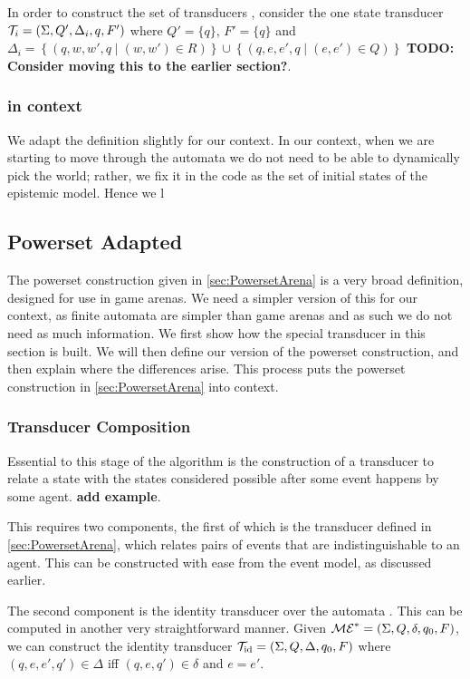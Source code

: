 \documentclass[12pt, a4paper]{article}
\begin{document}
In order to construct the set of transducers , consider the one state
transducer $\mathcal{T}_i = (\Sigma, Q', \Delta_i, q, F')$ where $Q' = \{q\}$, $F' =
\{q\}$ and $\Delta_i = \left\{ (q, w, w', q \mid (w, w') \in R) \right\} \cup
\left\{ (q, e, e', q \mid (e, e') \in Q) \right\}$ \textbf{TODO: Consider moving
this to the earlier section?}.

\subsubsection{\mestar in context}

We adapt the definition slightly for our context. In our context, when we are
starting to move through the automata we do not need to be able to dynamically
pick the world; rather, we fix it in the code as the set of initial states of
the epistemic model. Hence we l

\subsection{Powerset Adapted}
\label{sec:PowersetAdapted}

The powerset construction given in \ref{sec:PowersetArena} is a very broad
definition, designed for use in game arenas. We need a simpler version of this
for our context, as finite automata are simpler than game arenas and as such we
do not need as much information. We first show how the special transducer in
this section is built. We will then define our version of the powerset
construction, and then explain where the differences arise. This process puts
the powerset construction in \ref{sec:PowersetArena} into context.

\subsubsection{Transducer Composition}
\label{subsubsec:TransducerComposition}

Essential to this stage of the algorithm is the construction of a transducer to
relate a state with the states considered possible after some event happens by
some agent. \textbf{add example}.

This requires two components, the first of which is the transducer defined in
\ref{sec:PowersetArena}, which relates pairs of events that are
indistinguishable to an agent. This can be constructed with ease from the event
model, as discussed earlier.

The second component is the identity transducer over the automata \mestar. This
can be computed in another very straightforward manner. Given $\mathcal{ME}^\ast =
(\Sigma, Q, \delta, q_0, F)$, we can construct the identity transducer
$\mathcal{T}_{\text{id}} = (\Sigma, Q, \Delta, q_0, F)$ where $(q, e, e', q') \in
\Delta$ iff $(q, e, q') \in \delta$ and $e = e'$. 
\end{document}
